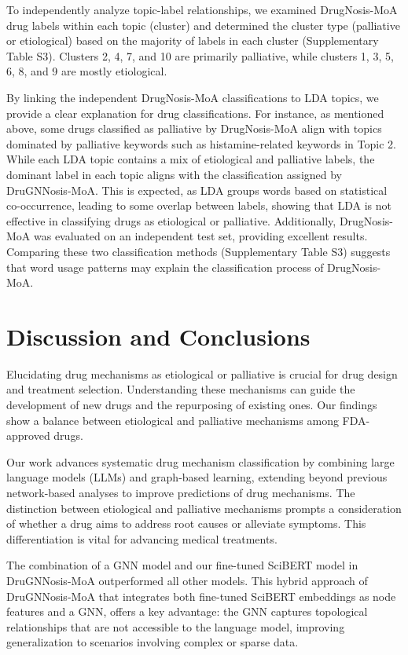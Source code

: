\documentclass[journal,twoside,web]{ieeecolor}
\begin{document}
To independently analyze topic-label relationships, we examined DrugNosis-MoA drug labels within each topic (cluster) and determined the cluster type (palliative or etiological) based on the majority of labels in each cluster (Supplementary Table S3).
Clusters 2, 4, 7, and 10 are primarily palliative, while clusters 1, 3, 5, 6, 8, and 9 are mostly etiological. 

By linking the independent DrugNosis-MoA classifications to LDA topics, we provide a clear explanation for drug classifications. 
For instance, as mentioned above, some drugs classified as palliative by DrugNosis-MoA align with topics dominated by palliative keywords such as histamine-related keywords in Topic 2. 
While each LDA topic contains a mix of etiological and palliative labels, the dominant label in each topic aligns with the classification assigned by DruGNNosis-MoA. 
This is expected, as LDA groups words based on statistical co-occurrence, leading to some overlap between labels, showing that LDA is not effective in classifying drugs as etiological or palliative. 
Additionally, DrugNosis-MoA was evaluated on an independent test set, providing excellent results. Comparing these two classification methods (Supplementary Table S3) suggests that word usage patterns may explain the classification process of DrugNosis-MoA.



\section{Discussion and Conclusions}
Elucidating drug mechanisms as etiological or palliative is crucial for drug design and treatment selection. 
Understanding these mechanisms can guide the development of new drugs and the repurposing of existing ones. 
Our findings show a balance between etiological and palliative mechanisms among FDA-approved drugs.

Our work advances systematic drug mechanism classification by combining large language models (LLMs) and graph-based learning, extending beyond previous network-based analyses to improve predictions of drug mechanisms.
The distinction between etiological and palliative mechanisms prompts a consideration of whether a drug aims to address root causes or alleviate symptoms. 
This differentiation is vital for advancing medical treatments.

The combination of a GNN model and our fine-tuned SciBERT model in DruGNNosis-MoA outperformed all other models. 
This hybrid approach of DruGNNosis-MoA that integrates both fine-tuned SciBERT embeddings as node features and a GNN, offers a key advantage: the GNN captures topological relationships that are not accessible to the language model, improving generalization to scenarios involving complex or sparse data.
\end{document}
